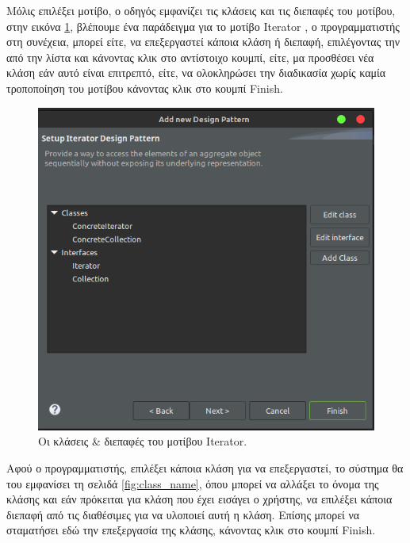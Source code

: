 Μόλις επιλέξει μοτίβο, ο οδηγός εμφανίζει τις κλάσεις και τις διεπαφές του μοτίβου, στην εικόνα \ref{fig:classes_interfaces}, 
βλέπουμε ένα παράδειγμα για το μοτίβο Iterator \cite{GoF}, ο προγραμματιστής στη συνέχεια, 
μπορεί είτε, να επεξεργαστεί κάποια κλάση ή διεπαφή, επιλέγοντας την από την λίστα και κάνοντας κλικ στο αντίστοιχο κουμπί, 
είτε, μα προσθέσει νέα κλάση εάν αυτό είναι επιτρεπτό, είτε, να ολοκληρώσει την διαδικασία χωρίς καμία τροποποίηση 
του μοτίβου κάνοντας κλικ στο κουμπί Finish.
\begin{figure}[H]
    \centering
    \includegraphics[width=1.0\textwidth]{Figures/classes_interfaces.png}
    \caption{Οι κλάσεις \& διεπαφές του μοτίβου Iterator.}
    \label{fig:classes_interfaces}
\end{figure}
Αφού ο προγραμματιστής, επιλέξει κάποια κλάση για να επεξεργαστεί, το σύστημα θα του εμφανίσει τη σελιδά \ref{fig:class_name}, 
όπου μπορεί να αλλάξει το όνομα της κλάσης και εάν πρόκειται για κλάση που έχει εισάγει ο χρήστης, 
να επιλέξει κάποια διεπαφή από τις διαθέσιμες για να υλοποιεί αυτή η κλάση. Επίσης μπορεί να σταματήσει εδώ την επεξεργασία της κλάσης, 
κάνοντας κλικ στο κουμπί Finish.
